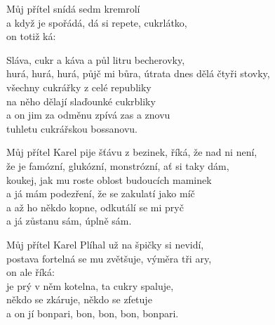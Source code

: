 
\ve{}
Můj přítel \quad {}snídá sedm kremrolí \\
a když je spořádá, dá si repete, cukrlátko,\\
on totiž ká: \quad {}  \quad {} \quad {}

\cho{}
Sláva, cukr a káva a půl litru becherovky,\\
hurá, hurá, hurá, půjč mi bůra, útrata dnes dělá čtyři stovky,\\
všechny cukrářky z celé republiky\\
na něho dělají slaďounké cukrbliky\\
a on jim za odměnu zpívá zas a znovu\\
tuhletu cukrářskou bossanovu.  \quad {} \quad {} \quad {}

\ve{}
Můj přítel Karel pije šťávu z bezinek, říká, že nad ni není,\\
že je famózní, glukózní, monstrózní, ať si taky dám,\\
koukej, jak mu roste oblost budoucích maminek\\
a já mám podezření, že se zakulatí jako míč\\
a až ho někdo kopne, odkutálí se mi pryč\\
a já zůstanu sám, úplně sám.

\cho{}

\ve{}
Můj přítel Karel Plíhal už na špičky si nevidí,\\
postava fortelná se mu zvětšuje, výměra tři ary,\\
on ale říká: \\
je prý v něm kotelna, ta cukry spaluje,\\
někdo se zkáruje, někdo se zfetuje\\
a on jí bonpari, bon, bon, bon, bonpari.

\cho{}

\esong